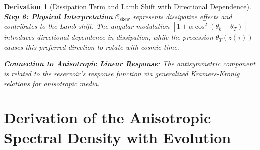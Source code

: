 \documentclass[10pt, a4paper]{article}
\newtheorem{derivation}{Derivation}
\begin{document}
\begin{derivation}[Dissipation Term and Lamb Shift with Directional Dependence]
\textbf{Step 6: Physical Interpretation}
$\mathcal{C}_{\text{skew}}$ represents dissipative effects and contributes to the Lamb shift. The angular modulation $[1 + \alpha \cos^2(\theta_k - \theta_T)]$ introduces directional dependence in dissipation, while the precession $\theta_T(z(\bar{\tau}))$ causes this preferred direction to rotate with cosmic time.

\textbf{Connection to Anisotropic Linear Response}: The antisymmetric component is related to the reservoir's response function via generalized Kramers-Kronig relations for anisotropic media.
\end{derivation}

\section{Derivation of the Anisotropic Spectral Density with Evolution}
\end{document}
